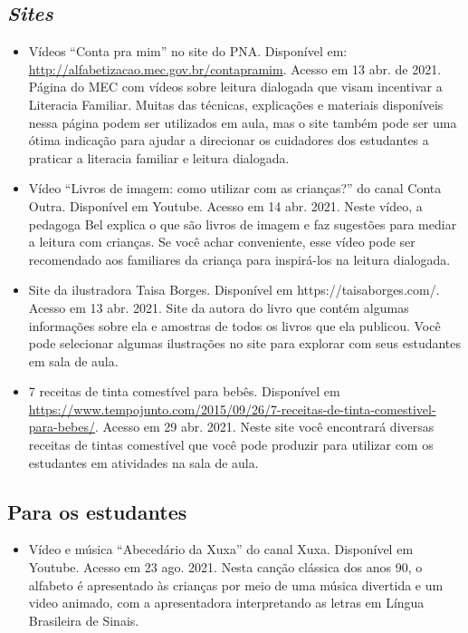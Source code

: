 \documentclass[11pt]{extarticle}
\begin{document}
\subsection{\textit{Sites}}

\begin{itemize}
\item Vídeos “Conta pra mim” no site do PNA. Disponível em: \url{http://alfabetizacao.mec.gov.br/contapramim}. 
Acesso em 13 abr. de 2021.
Página do MEC com vídeos sobre leitura dialogada que visam incentivar a Literacia Familiar. Muitas das 
técnicas, explicações e materiais disponíveis nessa página podem ser utilizados em aula, mas o site também 
pode ser uma ótima indicação para ajudar a direcionar os cuidadores dos estudantes a praticar 
a literacia familiar e leitura dialogada.

\item Vídeo “Livros de imagem: como utilizar com as crianças?” do canal Conta Outra. Disponível em Youtube. 
Acesso em 14 abr. 2021. 
Neste vídeo, a pedagoga Bel explica o que são livros de imagem e faz sugestões para mediar a leitura com 
crianças. Se você achar conveniente, esse vídeo pode ser recomendado aos familiares da criança 
para inspirá-los na leitura dialogada. 

\item Site da ilustradora Taisa Borges. Disponível em https://taisaborges.com/. Acesso em 13 abr. 2021. 
Site da autora do livro que contém algumas informações sobre ela e amostras de todos os livros que ela publicou. 
Você pode selecionar algumas ilustrações no site para explorar com seus estudantes em sala de aula. 

\item 7 receitas de tinta comestível para bebês. 
Disponível em \url{https://www.tempojunto.com/2015/09/26/7-receitas-de-tinta-comestivel-para-bebes/}. 
Acesso em 29 abr. 2021. 
Neste site você encontrará diversas receitas de tintas comestível que você pode produzir 
para utilizar com os estudantes em atividades na sala de aula. 
\end{itemize}

\subsection{Para os estudantes}
\begin{itemize}
\item Vídeo e música ``Abecedário da Xuxa'' do canal Xuxa. Disponível em Youtube. Acesso em 23 ago. 2021. 
Nesta canção clássica dos anos 90, o alfabeto é apresentado às crianças por meio de uma música 
divertida e um video animado, com a apresentadora interpretando as letras em Língua Brasileira de Sinais.
\end{itemize}
\end{document}
